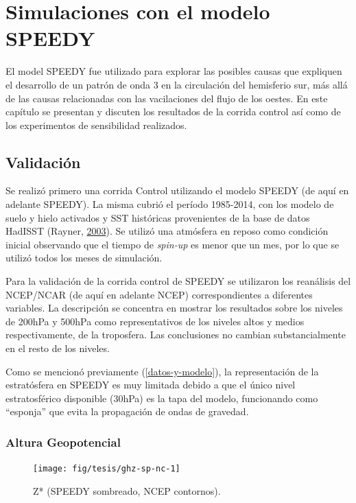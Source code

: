 \documentclass[spanish,a4paper,12pt,oneside]{book}
\begin{document}
\chapter{Simulaciones con el modelo
SPEEDY}\label{simulaciones-con-el-modelo-speedy}

El model SPEEDY fue utilizado para explorar las posibles causas que
expliquen el desarrollo de un patrón de onda 3 en la circulación del
hemisferio sur, más allá de las causas relacionadas con las vacilaciones
del flujo de los oestes. En este capítulo se presentan y discuten los
resultados de la corrida control así como de los experimentos de
sensibilidad realizados.

\section{Validación}\label{validacion}

Se realizó primero una corrida Control utilizando el modelo SPEEDY (de
aquí en adelante SPEEDY). La misma cubrió el período 1985-2014, con los
modelo de suelo y hielo activados y SST históricas provenientes de la
base de datos HadISST (Rayner,
\protect\hyperlink{ref-Rayner2003}{2003}). Se utilizó una atmósfera en
reposo como condición inicial observando que el tiempo de \emph{spin-up}
es menor que un mes, por lo que se utilizó todos los meses de
simulación.

Para la validación de la corrida control de SPEEDY se utilizaron los
reanálisis del NCEP/NCAR (de aquí en adelante NCEP) correspondientes a
diferentes variables. La descripción se concentra en mostrar los
resultados sobre los niveles de 200hPa y 500hPa como representativos de
los niveles altos y medios respectivamente, de la troposfera. Las
conclusiones no cambian substancialmente en el resto de los niveles.

Como se mencionó previamente (\autoref{datos-y-modelo}), la
representación de la estratósfera en SPEEDY es muy limitada debido a que
el único nivel estratosférico disponible (30hPa) es la tapa del modelo,
funcionando como ``esponja'' que evita la propagación de ondas de
gravedad.

\subsection{Altura Geopotencial}\label{altura-geopotencial-1}

\begin{landscape}\begin{figure}

{\centering \texttt{[image: fig/tesis/ghz-sp-nc-1]} 

}

\caption{Z* (SPEEDY sombreado, NCEP contornos).}\label{fig:ghz-sp-nc}
\end{figure}
\end{landscape}
\end{document}
